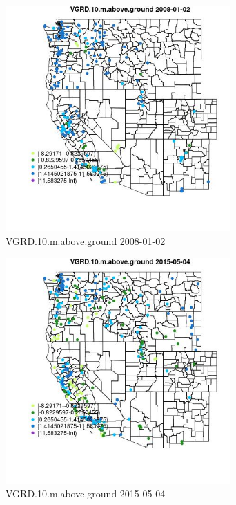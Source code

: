 \begin{figure} 
\centering  
\includegraphics[width=0.77\textwidth]{Code_Outputs/Report_ML_input_PM25_Step4_part_e_de_duplicated_aves_compiled_2019-05-18wNAs_MapObsVGRD10maboveground2008-01-02.jpg} 
\caption{\label{fig:Report_ML_input_PM25_Step4_part_e_de_duplicated_aves_compiled_2019-05-18wNAsMapObsVGRD10maboveground2008-01-02}VGRD.10.m.above.ground 2008-01-02} 
\end{figure} 
 

\begin{figure} 
\centering  
\includegraphics[width=0.77\textwidth]{Code_Outputs/Report_ML_input_PM25_Step4_part_e_de_duplicated_aves_compiled_2019-05-18wNAs_MapObsVGRD10maboveground2015-05-04.jpg} 
\caption{\label{fig:Report_ML_input_PM25_Step4_part_e_de_duplicated_aves_compiled_2019-05-18wNAsMapObsVGRD10maboveground2015-05-04}VGRD.10.m.above.ground 2015-05-04} 
\end{figure} 
 

